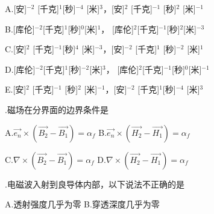 A.\hspace{0.8em}[安]$^{-2}$ [千克]$^1 $[秒]$^{-4}$ [米]$^{3}$，[安]$^2$ [千克]$^{-1}$ [秒]$^2$ [米]$^{-1}$\vspace{0.15cm}

B.\hspace{0.8em}[库伦]$^{-2}$[千克]$^{1}$[秒]$^{0}$[米]$^{1}$， [库伦]$^{2}$[千克]$^{-1}$[秒]$^{2}$[米]$^{-3}$ \vspace{0.15cm}

C.\hspace{0.8em}[安]$^{2}$ [千克]$^{-1} $[秒]$^{4}$ [米]$^{-3}$，[安]$^{-2}$ [千克]$^{1}$ [秒]$^{-2}$ [米]$^{1}$\vspace{0.15cm}

D.\hspace{0.8em}[库伦]$^{-2}$[千克]$^{1}$[秒]$^{-2}$[米]$^{3}$， [库伦]$^{2}$[千克]$^{-1}$[秒]$^{0}$[米]$^{-1}$ \vspace{0.15cm}

E.\hspace{0.8em}[安]$^2$ [千克]$^{-1}$ [秒]$^2$ [米]$^{-1}$，[安]$^{-2}$ [千克]$^1 $[秒]$^{-4}$ [米]$^{3}$

\vspace{0.2cm}

.\hspace{0.8em}磁场在分界面的边界条件是
\vspace{0.2cm}

A.\hspace{0.8em}$\Vec{e_n} \times (\Vec{B_2} - \Vec{B_1}) = \alpha_f$
\hspace{5em}
B.\hspace{0.8em}$\Vec{e_n} \times (\Vec{H_2} - \Vec{H_1}) = \alpha_f$\vspace{0.2cm}

C.\hspace{0.8em}$\nabla \times (\Vec{B_2} - \Vec{B_1}) = \alpha_f$
\hspace{5.1em}
D.\hspace{0.8em}$\nabla \times (\Vec{H_2} - \Vec{H_1}) = \alpha_f$
\vspace{0.2cm}

.\hspace{0.8em}电磁波入射到良导体内部，以下说法不正确的是\vspace{0.2cm}

A.\hspace{0.8em}透射强度几乎为零\hspace{11em}
B.\hspace{0.8em}穿透深度几乎为零\vspace{0.1cm}

